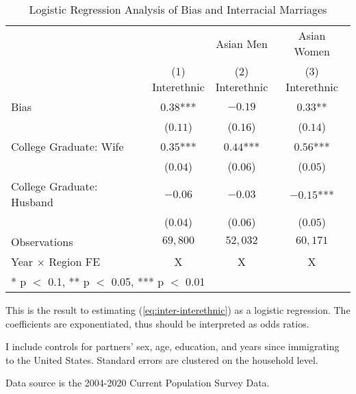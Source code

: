 \begin{table}[H]
\centering\centering
\caption{Logistic Regression Analysis of Bias and Interracial Marriages \label{regtab-logit-03}}
\centering
\begin{threeparttable}
\begin{tabular}[t]{lccc}
\toprule
\multicolumn{2}{c}{ } & \multicolumn{1}{c}{Asian Men} & \multicolumn{1}{c}{Asian Women} \\
\cmidrule(l{3pt}r{3pt}){3-3} \cmidrule(l{3pt}r{3pt}){4-4}
  & \specialcell{(1) \\ Interethnic} & \specialcell{(2) \\ Interethnic} & \specialcell{(3) \\ Interethnic}\\
\midrule
Bias & $0.38$*** & $-0.19$ & $0.33$**\\
 & ($0.11$) & ($0.16$) & ($0.14$)\\
College Graduate: Wife & $0.35$*** & $0.44$*** & $0.56$***\\
 & ($0.04$) & ($0.06$) & \vphantom{1} ($0.05$)\\
College Graduate: Husband & $-0.06$ & $-0.03$ & $-0.15$***\\
 & ($0.04$) & ($0.06$) & ($0.05$)\\
\midrule
Observations & $69,800$ & $52,032$ & $60,171$\\
Year $\times$ Region FE & X & X & X\\
\bottomrule
\multicolumn{4}{l}{\rule{0pt}{1em}* p $<$ 0.1, ** p $<$ 0.05, *** p $<$ 0.01}\\
\end{tabular}
\begin{tablenotes}
\small
\item[1] \footnotesize{This is the result to estimating (\ref{eq:inter-interethnic}) as a
                        logistic regression. The coefficients are exponentiated, thus should be interpreted as odds ratios.}
\item[2] \footnotesize{I include controls for partners' sex, age, education, 
                      and years since immigrating to the United States.
                      Standard errors are clustered on the household level.}
\item[3] \footnotesize{Data source is the 2004-2020 Current Population Survey Data.}
\end{tablenotes}
\end{threeparttable}
\end{table}
